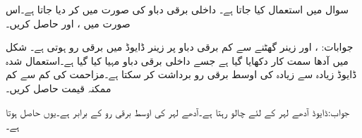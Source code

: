 سوال  میں  استعمال کیا جاتا ہے۔ داخلی برقی دباو  کی صورت میں  کر دیا جاتا ہے۔اس صورت میں ،  اور  حاصل کریں۔


جوابات: ،  اور زینر گھٹنے سے کم برقی دباو پر زینر ڈایوڈ میں برقی رو  ہوتی ہے۔ 
شکل  میں آدھا سمت کار دکھایا گیا ہے جسے  داخلی برقی دباو مہیا کیا گیا ہے۔استعمال شدہ ڈایوڈ زیادہ سے زیادہ  کی اوسط برقی رو برداشت کر سکتا ہے۔مزاحمت کی کم سے کم ممکنہ قیمت حاصل کریں۔

جواب:ڈایوڈ آدھے لہر کے لئے چالو رہتا ہے۔آدھے لہر کی اوسط برقی رو  کے برابر ہے۔یوں  حاصل ہوتا ہے۔ 



